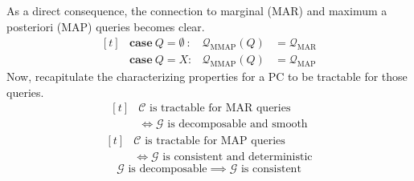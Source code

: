 \documentclass[9pt,fleqn,twoside,twocolumn]{stdglobal}
\DeclareMathOperator*{\argmax}{arg\ max}
\DeclareMathOperator{\val}{val}
\begin{document}
  \noindent
  As a direct consequence, the connection to marginal (MAR) and maximum a posteriori (MAP) queries becomes clear.
  \[
    \begin{aligned}[t]
      &\mathbf{case}\ Q=\emptyset\ : &\mathscr{Q}_\mathrm{MMAP}(Q) &= \mathscr{Q}_\mathrm{MAR} \\
      &\mathbf{case}\ Q=X: &\mathscr{Q}_\mathrm{MMAP}(Q) &= \mathscr{Q}_\mathrm{MAP}
    \end{aligned}
  \]
  Now, recapitulate the characterizing properties for a PC to be tractable for those queries.
  \[
    \begin{aligned}[t]
      &\text{$\mathscr{C}$ is tractable for MAR queries} \\
      &\iff \text{$\mathscr{G}$ is decomposable and smooth}
    \end{aligned}
  \]
  \[
    \begin{aligned}[t]
      &\text{$\mathscr{C}$ is tractable for MAP queries} \\
      &\iff \text{$\mathscr{G}$ is consistent and deterministic}
    \end{aligned}
  \]
  \[
    \text{$\mathscr{G}$ is decomposable} \implies \text{$\mathscr{G}$ is consistent}
  \]



\end{document}
